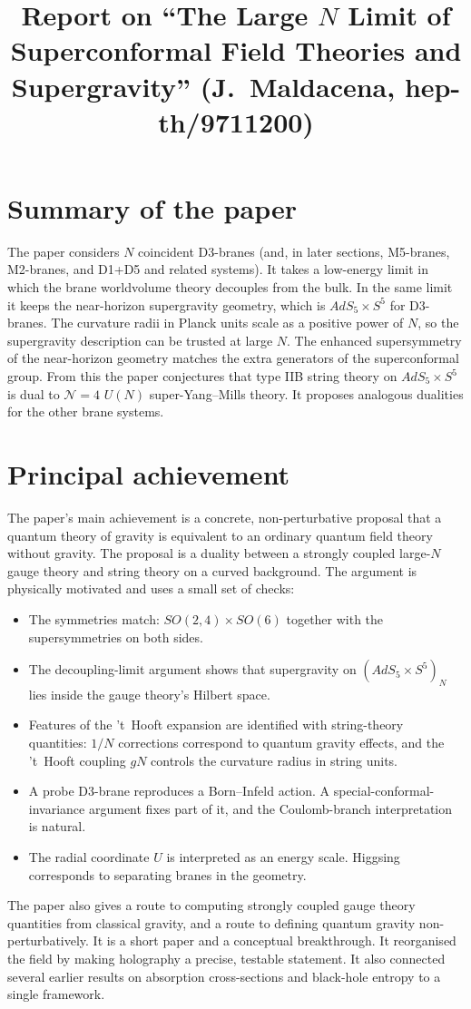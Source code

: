 \documentclass[11pt]{article}
\title{Report on ``The Large $N$ Limit of Superconformal Field Theories and Supergravity'' (J.~Maldacena, hep-th/9711200)}
\author{}
\date{}
\begin{document}
\maketitle

\section*{Summary of the paper}
The paper considers $N$ coincident D3-branes (and, in later sections, M5-branes, M2-branes, and D1+D5 and related systems). It takes a low-energy limit in which the brane worldvolume theory decouples from the bulk. In the same limit it keeps the near-horizon supergravity geometry, which is $AdS_5\times S^5$ for D3-branes. The curvature radii in Planck units scale as a positive power of $N$, so the supergravity description can be trusted at large $N$. The enhanced supersymmetry of the near-horizon geometry matches the extra generators of the superconformal group. From this the paper conjectures that type IIB string theory on $AdS_5\times S^5$ is dual to $\mathcal N=4$ $U(N)$ super-Yang--Mills theory. It proposes analogous dualities for the other brane systems.

\section{Principal achievement}
The paper's main achievement is a concrete, non-perturbative proposal that a quantum theory of gravity is equivalent to an ordinary quantum field theory without gravity. The proposal is a duality between a strongly coupled large-$N$ gauge theory and string theory on a curved background. The argument is physically motivated and uses a small set of checks:
\begin{itemize}
\item The symmetries match: $SO(2,4)\times SO(6)$ together with the supersymmetries on both sides.
\item The decoupling-limit argument shows that supergravity on $(AdS_5\times S^5)_N$ lies inside the gauge theory's Hilbert space.
\item Features of the 't~Hooft expansion are identified with string-theory quantities: $1/N$ corrections correspond to quantum gravity effects, and the 't~Hooft coupling $gN$ controls the curvature radius in string units.
\item A probe D3-brane reproduces a Born--Infeld action. A special-conformal-invariance argument fixes part of it, and the Coulomb-branch interpretation is natural.
\item The radial coordinate $U$ is interpreted as an energy scale. Higgsing corresponds to separating branes in the geometry.
\end{itemize}
The paper also gives a route to computing strongly coupled gauge theory quantities from classical gravity, and a route to defining quantum gravity non-perturbatively. It is a short paper and a conceptual breakthrough. It reorganised the field by making holography a precise, testable statement. It also connected several earlier results on absorption cross-sections and black-hole entropy to a single framework.
\end{document}
